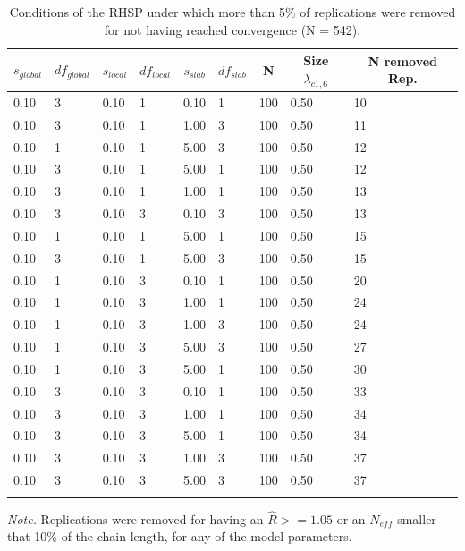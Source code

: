 \documentclass[
  man, donotrepeattitle,floatsintext]{apa6}
\begin{document}
\begin{table}[tbp]

\begin{center}
\begin{threeparttable}

\caption{\label{tab:unnamed-chunk-3}Conditions of the RHSP under which more than 5\% of replications were removed for not having reached convergence (N = 542).}

\begin{tabular}{lllllllll}
\toprule
$s_{global}$ & \multicolumn{1}{c}{$df_{global}$} & \multicolumn{1}{c}{$s_{local}$} & \multicolumn{1}{c}{$df_{local}$} & \multicolumn{1}{c}{$s_{slab}$} & \multicolumn{1}{c}{$df_{slab}$} & \multicolumn{1}{c}{N} & \multicolumn{1}{c}{Size $\lambda_{c1 , 6}$} & \multicolumn{1}{c}{N removed Rep.}\\
\midrule
0.10 & 3 & 0.10 & 1 & 0.10 & 1 & 100 & 0.50 & 10\\
0.10 & 3 & 0.10 & 1 & 1.00 & 3 & 100 & 0.50 & 11\\
0.10 & 1 & 0.10 & 1 & 5.00 & 3 & 100 & 0.50 & 12\\
0.10 & 3 & 0.10 & 1 & 5.00 & 1 & 100 & 0.50 & 12\\
0.10 & 3 & 0.10 & 1 & 1.00 & 1 & 100 & 0.50 & 13\\
0.10 & 3 & 0.10 & 3 & 0.10 & 3 & 100 & 0.50 & 13\\
0.10 & 1 & 0.10 & 1 & 5.00 & 1 & 100 & 0.50 & 15\\
0.10 & 3 & 0.10 & 1 & 5.00 & 3 & 100 & 0.50 & 15\\
0.10 & 1 & 0.10 & 3 & 0.10 & 1 & 100 & 0.50 & 20\\
0.10 & 1 & 0.10 & 3 & 1.00 & 1 & 100 & 0.50 & 24\\
0.10 & 1 & 0.10 & 3 & 1.00 & 3 & 100 & 0.50 & 24\\
0.10 & 1 & 0.10 & 3 & 5.00 & 3 & 100 & 0.50 & 27\\
0.10 & 1 & 0.10 & 3 & 5.00 & 1 & 100 & 0.50 & 30\\
0.10 & 3 & 0.10 & 3 & 0.10 & 1 & 100 & 0.50 & 33\\
0.10 & 3 & 0.10 & 3 & 1.00 & 1 & 100 & 0.50 & 34\\
0.10 & 3 & 0.10 & 3 & 5.00 & 1 & 100 & 0.50 & 34\\
0.10 & 3 & 0.10 & 3 & 1.00 & 3 & 100 & 0.50 & 37\\
0.10 & 3 & 0.10 & 3 & 5.00 & 3 & 100 & 0.50 & 37\\
\bottomrule
\addlinespace
\end{tabular}

\begin{tablenotes}[para]
\normalsize{\textit{Note.} Replications were removed for having an $\hat{R} >= 1.05$ or an $N_{eff}$  smaller that 10\% of the chain-length, for any of the model parameters.}
\end{tablenotes}

\end{threeparttable}
\end{center}

\end{table}
\end{document}
